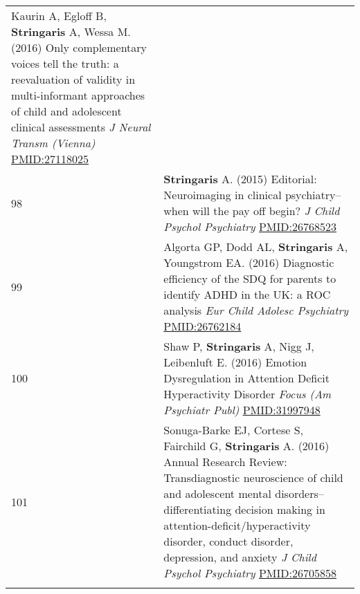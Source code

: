 \documentclass[
]{article}
\begin{document}
\begin{longtable}[]{@{}ll@{}}
\begin{minipage}[t]{0.94\columnwidth}
Kaurin A, Egloff B, \textbf{Stringaris} A, Wessa M. (2016) Only
complementary voices tell the truth: a reevaluation of validity in
multi-informant approaches of child and adolescent clinical assessments
\emph{J Neural Transm (Vienna)} \url{PMID:27118025}\strut
\end{minipage}\tabularnewline
\begin{minipage}[t]{0.01\columnwidth}\raggedright
98\strut
\end{minipage} & \begin{minipage}[t]{0.94\columnwidth}\raggedright
\textbf{Stringaris} A. (2015) Editorial: Neuroimaging in clinical
psychiatry--when will the pay off begin? \emph{J Child Psychol
Psychiatry} \url{PMID:26768523}\strut
\end{minipage}\tabularnewline
\begin{minipage}[t]{0.01\columnwidth}\raggedright
99\strut
\end{minipage} & \begin{minipage}[t]{0.94\columnwidth}\raggedright
Algorta GP, Dodd AL, \textbf{Stringaris} A, Youngstrom EA. (2016)
Diagnostic efficiency of the SDQ for parents to identify ADHD in the UK:
a ROC analysis \emph{Eur Child Adolesc Psychiatry}
\url{PMID:26762184}\strut
\end{minipage}\tabularnewline
\begin{minipage}[t]{0.01\columnwidth}\raggedright
100\strut
\end{minipage} & \begin{minipage}[t]{0.94\columnwidth}\raggedright
Shaw P, \textbf{Stringaris} A, Nigg J, Leibenluft E. (2016) Emotion
Dysregulation in Attention Deficit Hyperactivity Disorder \emph{Focus
(Am Psychiatr Publ)} \url{PMID:31997948}\strut
\end{minipage}\tabularnewline
\begin{minipage}[t]{0.01\columnwidth}\raggedright
101\strut
\end{minipage} & \begin{minipage}[t]{0.94\columnwidth}\raggedright
Sonuga-Barke EJ, Cortese S, Fairchild G, \textbf{Stringaris} A. (2016)
Annual Research Review: Transdiagnostic neuroscience of child and
adolescent mental disorders--differentiating decision making in
attention-deficit/hyperactivity disorder, conduct disorder, depression,
and anxiety \emph{J Child Psychol Psychiatry} \url{PMID:26705858}\strut
\end{minipage}\tabularnewline
\begin{minipage}[t]{0.01\columnwidth}\raggedright

\end{minipage}
\end{longtable}
\end{document}
